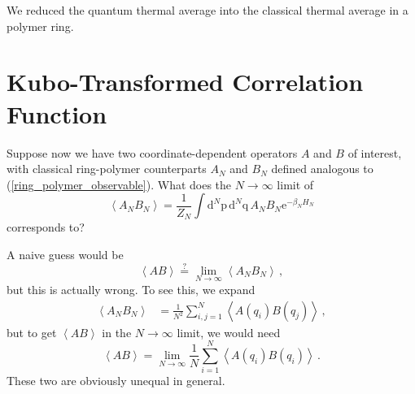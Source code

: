 \documentclass{article}
\theoremstyle{plain}\theoremheaderfont{\normalfont\itshape}\theorembodyfont{\rmfamily}\theoremseparator{.}\newtheorem*{rem}{Remark}\newtheorem*{ex}{Example}\newtheorem*{proof}{Proof}\newtheorem*{altp}{Alternative proof}
\theoremstyle{plain}\theoremheaderfont{\normalfont\bfseries}\theorembodyfont{\rmfamily}\theoremseparator{.}\newtheorem{thm}{Theorem}[section]\newtheorem{lem}[thm]{Lemma}\newtheorem{prop}[thm]{Proposition}\newtheorem*{cor}{Corollary}\newtheorem{defn}[thm]{Definition}\newtheorem{clm}[thm]{Claim}\newtheorem{clminproof}{Claim}
\theoremstyle{break}\theoremheaderfont{\normalfont\itshape}\theorembodyfont{\rmfamily}\theoremseparator{.\medskip}\newtheorem*{proofskip}{Proof}\newtheorem*{exs}{Examples}\newtheorem*{rems}{Remarks}
\theoremstyle{break}\theoremheaderfont{\normalfont\bfseries}\theorembodyfont{\rmfamily}\theoremseparator{.\medskip}\newtheorem{lemskip}[thm]{Lemma}\newtheorem{defnskip}[thm]{Definition}\newtheorem{propskip}[thm]{Proposition}\newtheorem{thmskip}[thm]{Theorem}
\numberwithin{equation}{section}
\newcommand{\ee}{\mathrm{e}}
\newcommand{\dd}[2][]{\mathrm{d}^{#1} #2\,}
\newcommand{\eval}[1]{\left\langle #1 \right\rangle}
\newcommand{\vb}[1]{\bm{\mathrm{#1}}}
\begin{document}
    We reduced the quantum thermal average into the classical thermal average in a polymer ring.

    \newpage
    \section{Kubo-Transformed Correlation Function}
    Suppose now we have two coordinate-dependent operators \(A\) and \(B\) of interest, with classical ring-polymer counterparts \(A_N\) and \(B_N\) defined analogous to (\ref{ring_polymer_observable}). What does the \(N\to\infty\) limit of
    \begin{equation}
        \eval{A_N B_N}=\frac{1}{Z_N}\int\dd[N]{\vb{p}}\dd[N]{\vb{q}}A_N B_N \ee^{-\beta_N H_N}
    \end{equation}
    corresponds to?

    A naive guess would be
    \begin{equation}
        \eval{AB}\stackrel{?}{=}\lim_{N\to\infty}\eval{A_N B_N}\,,
    \end{equation}
    but this is actually wrong. To see this, we expand
    \begin{align}
        \eval{A_N B_N}&=\frac{1}{N^2}\sum_{i,j=1}^{N}\eval{A(q_i)B(q_j)}\,,
    \end{align}
    but to get \(\eval{AB}\) in the \(N\to\infty\) limit, we would need
    \begin{equation}
        \eval{AB}=\lim_{N\to\infty}\frac{1}{N}\sum_{i=1}^{N}\eval{A(q_i)B(q_i)}\,.
    \end{equation}
    These two are obviously unequal in general.
\end{document}
